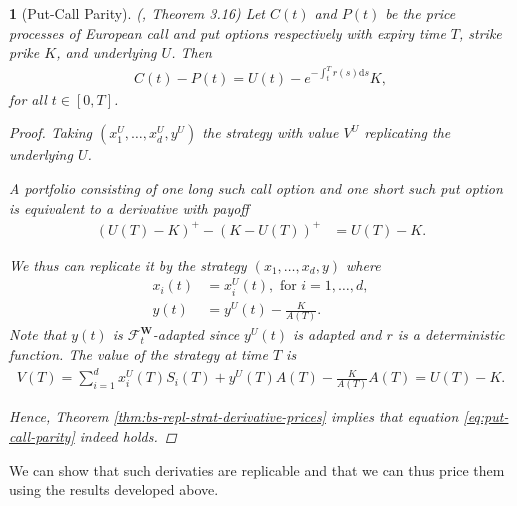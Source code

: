 \documentclass[english]{article}
\numberwithin{equation}{section}
\numberwithin{figure}{section}
\theoremstyle{bolddescit}
\newtheorem{theorem}{\protect\theoremname}[section]
\theoremstyle{definition}
\theoremstyle{definition}
\theoremstyle{plain}
\theoremstyle{plain}
\theoremstyle{bolddesc}
\theoremstyle{plain}
\theoremstyle{remark}
\providecommand{\theoremname}{Theorem}
\begin{document}
\begin{theorem}[Put-Call Parity]\label{thm:put-call-parity}
  (\cite{capinski_blackscholes_2012}, Theorem 3.16)
  Let $C(t)$ and $P(t)$ be the price processes of European call and put options respectively with expiry time $T$, strike prike $K$, and underlying $U$. Then
  \begin{align}\label{eq:put-call-parity}
    C(t) - P(t) = U(t) - e^{-\int_t^T r(s) \mathrm{d}s} K,
  \end{align}
  for all $t \in [0,T]$.

  \begin{proof}
    Taking $(x_1^U,\ldots,x_d^U,y^U)$ the strategy with value $V^U$ replicating the underlying $U$.

    A portfolio consisting of one long such call option and one short such put option is equivalent to a derivative with payoff
    \begin{align*}
      (U(T) - K)^+ - (K - U(T))^+
      &= U(T) - K.
    \end{align*}

    We thus can replicate it by the strategy $(x_1,\ldots,x_d,y)$ where
    \begin{align*}
      x_i(t) &= x_i^U(t), \text{ for } i=1,\ldots,d,\\
      y(t) &= y^U(t) - \frac{K}{A(T)}.
    \end{align*}
    Note that $y(t)$ is $\mathcal{F}^\mathbf{W}_t$-adapted since $y^U(t)$ is adapted and $r$ is a deterministic function. The value of the strategy at time $T$ is
    \begin{align*}
      V(T) = \sum_{i=1}^d x_i^U(T) S_i(T) + y^U(T) A(T) - \frac{K}{A(T)} A(T)
      = U(T) - K.
    \end{align*}

    Hence, Theorem \ref{thm:bs-repl-strat-derivative-prices} implies that equation \eqref{eq:put-call-parity} indeed holds.
  \end{proof}
\end{theorem}

We can show that such derivaties are replicable and that we can thus price them using the results developed above.
\end{document}
